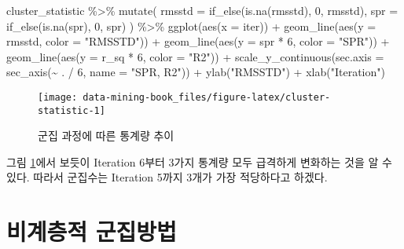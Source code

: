 \documentclass[
]{book}
\newenvironment{Shaded}{\begin{snugshade}}{\end{snugshade}}
\newcommand{\AttributeTok}[1]{\textcolor[rgb]{0.77,0.63,0.00}{#1}}
\newcommand{\DecValTok}[1]{\textcolor[rgb]{0.00,0.00,0.81}{#1}}
\newcommand{\FunctionTok}[1]{\textcolor[rgb]{0.00,0.00,0.00}{#1}}
\newcommand{\NormalTok}[1]{#1}
\newcommand{\SpecialCharTok}[1]{\textcolor[rgb]{0.00,0.00,0.00}{#1}}
\newcommand{\StringTok}[1]{\textcolor[rgb]{0.31,0.60,0.02}{#1}}
\begin{document}
\begin{Shaded}
\begin{Highlighting}[]
\NormalTok{cluster\_statistic }\SpecialCharTok{\%\textgreater{}\%}
  \FunctionTok{mutate}\NormalTok{(}
    \AttributeTok{rmsstd =} \FunctionTok{if\_else}\NormalTok{(}\FunctionTok{is.na}\NormalTok{(rmsstd), }\DecValTok{0}\NormalTok{, rmsstd),}
    \AttributeTok{spr =} \FunctionTok{if\_else}\NormalTok{(}\FunctionTok{is.na}\NormalTok{(spr), }\DecValTok{0}\NormalTok{, spr)}
\NormalTok{    ) }\SpecialCharTok{\%\textgreater{}\%}
  \FunctionTok{ggplot}\NormalTok{(}\FunctionTok{aes}\NormalTok{(}\AttributeTok{x =}\NormalTok{ iter)) }\SpecialCharTok{+}
  \FunctionTok{geom\_line}\NormalTok{(}\FunctionTok{aes}\NormalTok{(}\AttributeTok{y =}\NormalTok{ rmsstd, }\AttributeTok{color =} \StringTok{"RMSSTD"}\NormalTok{)) }\SpecialCharTok{+}
  \FunctionTok{geom\_line}\NormalTok{(}\FunctionTok{aes}\NormalTok{(}\AttributeTok{y =}\NormalTok{ spr }\SpecialCharTok{*} \DecValTok{6}\NormalTok{, }\AttributeTok{color =} \StringTok{"SPR"}\NormalTok{)) }\SpecialCharTok{+} 
  \FunctionTok{geom\_line}\NormalTok{(}\FunctionTok{aes}\NormalTok{(}\AttributeTok{y =}\NormalTok{ r\_sq }\SpecialCharTok{*} \DecValTok{6}\NormalTok{, }\AttributeTok{color =} \StringTok{"R2"}\NormalTok{)) }\SpecialCharTok{+} 
  \FunctionTok{scale\_y\_continuous}\NormalTok{(}\AttributeTok{sec.axis =} \FunctionTok{sec\_axis}\NormalTok{(}\SpecialCharTok{\textasciitilde{}}\NormalTok{ . }\SpecialCharTok{/} \DecValTok{6}\NormalTok{, }\AttributeTok{name =} \StringTok{"SPR, R2"}\NormalTok{)) }\SpecialCharTok{+}
  \FunctionTok{ylab}\NormalTok{(}\StringTok{"RMSSTD"}\NormalTok{) }\SpecialCharTok{+}
  \FunctionTok{xlab}\NormalTok{(}\StringTok{"Iteration"}\NormalTok{)}
\end{Highlighting}
\end{Shaded}

\begin{figure}

{\centering \texttt{[image: data-mining-book\_files/figure-latex/cluster-statistic-1]} 

}

\caption{군집 과정에 따른 통계량 추이}\label{fig:cluster-statistic}
\end{figure}

그림 \ref{fig:cluster-statistic}에서 보듯이 Iteration 6부터 3가지 통계량 모두 급격하게 변화하는 것을 알 수 있다. 따라서 군집수는 Iteration 5까지 3개가 가장 적당하다고 하겠다.

\hypertarget{nonhierarchical-clustering}{%
\chapter{비계층적 군집방법}\label{nonhierarchical-clustering}}
\end{document}
